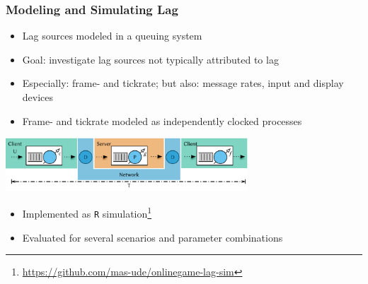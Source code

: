 \documentclass{UDEbeamerEN}
\begin{document}
\begin{frame}
	\frametitle{Modeling and Simulating Lag}

	\begin{itemize}
		\item Lag sources modeled in a queuing system
		\item Goal: investigate lag sources not typically attributed to lag
		\item Especially: frame- and tickrate; but also: message rates, input and display devices
		\item Frame- and tickrate modeled as independently clocked processes
	\end{itemize}

	\pause
	\begin{center}
		\includegraphics[height=2cm]{../../../models/e2e-lag-model.pdf}
	\end{center}

	\vspace{-4mm}
	\begin{itemize}
		\item Implemented as \texttt{R} simulation\footnote[frame]{\url{https://github.com/mas-ude/onlinegame-lag-sim}}
		\item Evaluated for several scenarios and parameter combinations
	\end{itemize}

\end{frame}
\end{document}
